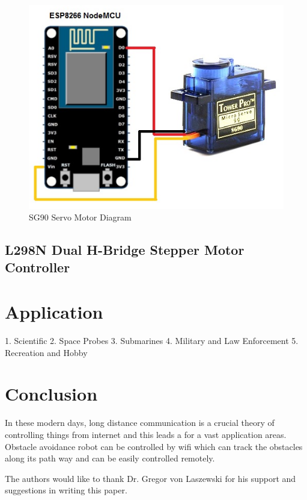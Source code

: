 \documentclass[sigconf]{acmart}
\begin{document}
\begin{figure}
	\includegraphics[width=1.0\columnwidth]{paper2/images/SG90-servo.jpg}
	\caption{SG90 Servo Motor Diagram}
\end{figure}

\subsection{L298N Dual H-Bridge Stepper Motor Controller}




\section{Application}
1. Scientific
2. Space Probes
3. Submarines
4. Military and Law Enforcement
5. Recreation and Hobby

\section{Conclusion}
In these modern days, long distance communication is a crucial theory of controlling things from internet and this leads a for a vast application areas. Obstacle avoidance robot can be controlled by wifi which can track the obstacles along its path way and can be easily controlled remotely.

\begin{acks}

The authors would like to thank Dr. Gregor von Laszewski for his support and suggestions in writing this paper.

\end{acks}


 
\end{document}

